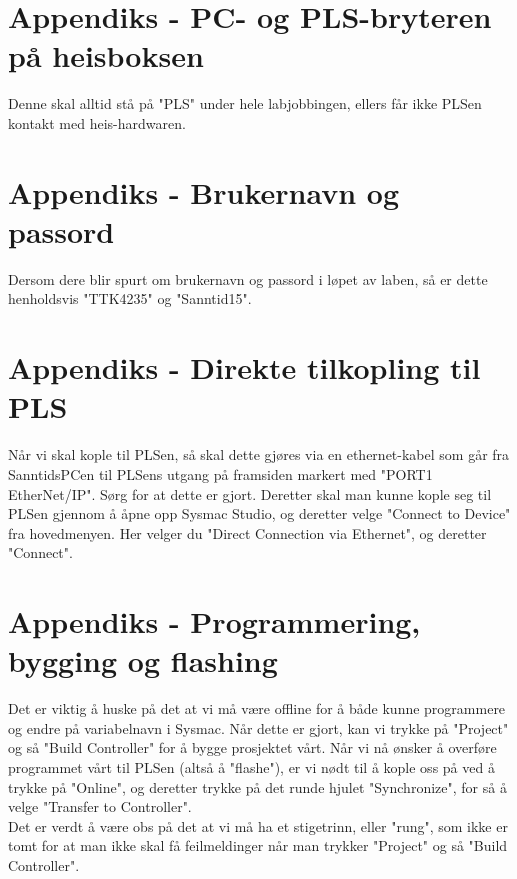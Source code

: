 \appendix
\section{Appendiks - PC- og PLS-bryteren på heisboksen}
Denne skal alltid stå på "PLS" under hele labjobbingen, ellers får ikke PLSen kontakt med heis-hardwaren.

\section{Appendiks - Brukernavn og passord}
Dersom dere blir spurt om brukernavn og passord i løpet av laben, så er dette henholdsvis "TTK4235" og "Sanntid15".

\section{Appendiks - Direkte tilkopling til PLS}
Når vi skal kople til PLSen, så skal dette gjøres via en ethernet-kabel som går fra SanntidsPCen til PLSens utgang på framsiden markert med "PORT1 EtherNet/IP". Sørg for at dette er gjort. Deretter skal man kunne kople seg til PLSen gjennom å åpne opp Sysmac Studio, og deretter velge "Connect to Device" fra hovedmenyen.  Her velger du "Direct Connection via Ethernet", og deretter "Connect".\\


\section{Appendiks - Programmering, bygging og flashing}
Det er viktig å huske på det at vi må være offline for å både kunne programmere og endre på variabelnavn i Sysmac. Når dette er gjort, kan vi trykke på "Project" og så "Build Controller" for å bygge prosjektet vårt. Når vi nå ønsker å overføre programmet vårt til PLSen (altså å "flashe"), er vi nødt til å kople oss på ved å trykke på "Online", og deretter trykke på det runde hjulet "Synchronize", for så å velge "Transfer to Controller".\\

Det er verdt å være obs på det at vi må ha et stigetrinn, eller "rung", som ikke er tomt for at man ikke skal få feilmeldinger når man trykker "Project" og så "Build Controller".\\

